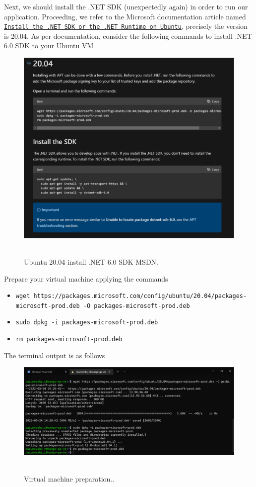 Next, we should install the .NET SDK (unexpectedly again) in order to run our application.
Proceeding, we refer to the Microsoft documentation article named
\href{https://docs.microsoft.com/en-us/dotnet/core/install/linux-ubuntu}
{\texttt{Install the .NET SDK or the .NET Runtime on Ubuntu}}, precisely the version is 20.04.
As per documentation, consider the following commands to install .NET 6.0 SDK to your Ubuntu VM
\begin{figure}[H]
    \centering
    \includegraphics[width=1\textwidth]{img/03_1_sdk_documentation}
    ~\caption{Ubuntu 20.04 install .NET 6.0 SDK MSDN.}\label{fig:figure2}
\end{figure}
Prepare your virtual machine applying the commands
\begin{itemize}
    \item \texttt{wget https://packages.microsoft.com/config/ubuntu/20.04/packages-microsoft-prod.deb -O packages-microsoft-prod.deb}
    \item \texttt{sudo dpkg -i packages-microsoft-prod.deb}
    \item \texttt{rm packages-microsoft-prod.deb}
\end{itemize}
The terminal output is as follows
\begin{figure}[H]
    \centering
    \includegraphics[width=1\textwidth]{img/03_3_vm_prepare}
    ~\caption{Virtual machine preparation..}\label{fig:figure3}
\end{figure}
